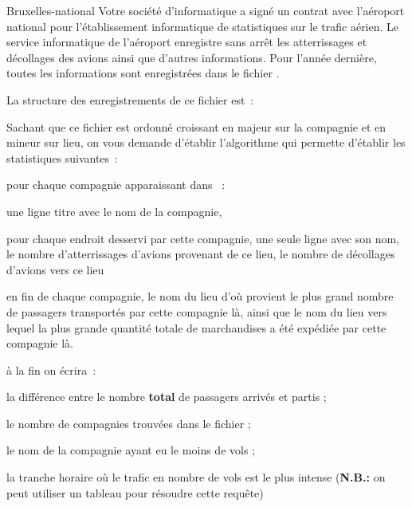 \begin{Exercice}{Bruxelles-national}
	Votre société d’informatique a signé un contrat avec l’aéroport national
	pour l’établissement informatique de statistiques sur le trafic aérien.
	Le service informatique de l’aéroport enregistre sans arrêt les
	atterrissages et décollages des avions ainsi que d’autres informations.
	Pour l’année dernière, toutes les informations sont enregistrées dans
	le fichier .

	La structure  des enregistrements de ce fichier est~: 


	Sachant que ce fichier est ordonné croissant en majeur sur la compagnie
	et en mineur sur lieu, on vous demande d’établir l’algorithme qui
	permette d’établir les statistiques suivantes~:

	\begin{liste}
		\item 
			pour chaque compagnie apparaissant dans ~:
		\begin{liste}
			\item 
				une ligne titre avec le nom de la compagnie,
			\item 
				pour chaque endroit desservi par cette compagnie, une seule ligne avec
				son nom, le nombre d’atterrissages d’avions provenant de ce lieu, le
				nombre de décollages d’avions vers ce lieu
			\item 
				en fin de chaque compagnie, le nom du lieu d’où provient le plus grand
				nombre de passagers transportés par cette compagnie là, ainsi que le
				nom du lieu vers lequel la plus grande quantité totale de marchandises
				a été expédiée par cette compagnie là.
		\end{liste}
		\item 
			à la fin on écrira~: 
		\begin{liste}
			\item 
				la différence entre le nombre \textbf{total} de passagers arrivés et
				partis ;
			\item 
				le nombre de compagnies trouvées dans le fichier ;
			\item 
				le nom de la compagnie ayant eu le moins de vols ;
			\item 
				la tranche horaire où le trafic en nombre de vols est le plus intense
				(\textbf{N.B.:} on peut utiliser un tableau pour résoudre cette
				requête)
		\end{liste}
	\end{liste}
	

\end{Exercice}
